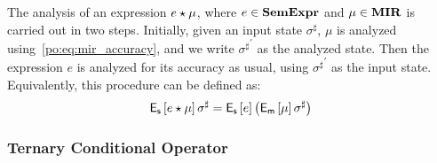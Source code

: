 The analysis of an expression $e \mathbin{\star} \mu$, where $e \in \mathbf{SemExpr}$ and $\mu
\in \mathbf{MIR}$ is carried out in two steps.  Initially, given an input state
$\sigma^\sharp$, $\mu$ is analyzed using~\eqref{po:eq:mir_accuracy}, and we
write ${\sigma^\sharp}^\prime$ as the analyzed state.  Then the expression $e$
is analyzed for its accuracy as usual, using ${\sigma^\sharp}^\prime$ as the
input state.  Equivalently, this procedure can be defined as:
\begin{equation}
    \operatorname{\mathsf{E}_\mathsf{s}}\left[{e \mathbin{\star} \mu}\right]{\sigma^\sharp}
    = \operatorname{\mathsf{E}_\mathsf{s}}\left[{e}\right]{\left( \ensuremath{\operatorname{\mathsf{E}_\mathsf{m}}}\left[{\mu}\right]{\sigma^\sharp} \right)}
\end{equation}

\subsubsection{Ternary Conditional Operator}

